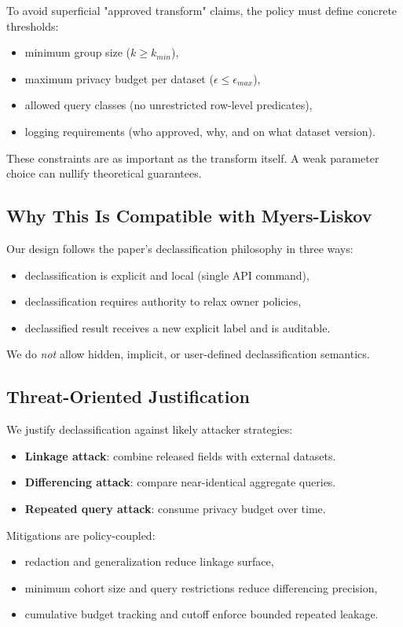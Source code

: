 To avoid superficial "approved transform" claims, the policy must define concrete thresholds:
\begin{itemize}
  \item minimum group size ($k \geq k_{min}$),
  \item maximum privacy budget per dataset ($\epsilon \leq \epsilon_{max}$),
  \item allowed query classes (no unrestricted row-level predicates),
  \item logging requirements (who approved, why, and on what dataset version).
\end{itemize}

These constraints are as important as the transform itself. A weak parameter choice can nullify theoretical guarantees.

\subsection{Why This Is Compatible with Myers-Liskov}

Our design follows the paper's declassification philosophy in three ways:
\begin{itemize}
  \item declassification is explicit and local (single API command),
  \item declassification requires authority to relax owner policies,
  \item declassified result receives a new explicit label and is auditable.
\end{itemize}

We do \emph{not} allow hidden, implicit, or user-defined declassification semantics.

\subsection{Threat-Oriented Justification}

We justify declassification against likely attacker strategies:
\begin{itemize}
  \item \textbf{Linkage attack}: combine released fields with external datasets.
  \item \textbf{Differencing attack}: compare near-identical aggregate queries.
  \item \textbf{Repeated query attack}: consume privacy budget over time.
\end{itemize}

Mitigations are policy-coupled:
\begin{itemize}
  \item redaction and generalization reduce linkage surface,
  \item minimum cohort size and query restrictions reduce differencing precision,
  \item cumulative budget tracking and cutoff enforce bounded repeated leakage.
\end{itemize}

